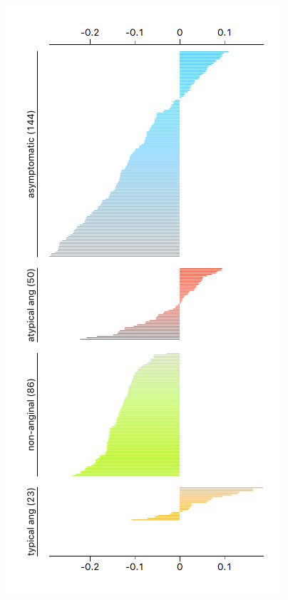 \begin{marginfigure}
    \centering
    \includegraphics[width=\linewidth]{silhouette-chest-pain.png}
    \caption{$\;$}
\end{marginfigure}

